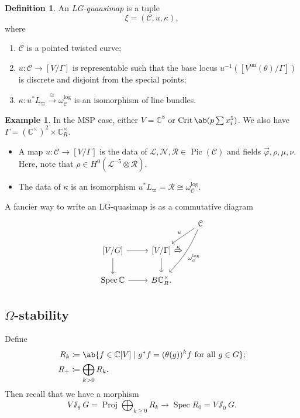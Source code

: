 \documentclass[10pt,oldfontcommands,oneside]{memoir}
\theoremstyle{definition}
\newtheorem{defn}[thm]{Definition}
\newtheorem{exm}[thm]{Example}
\theoremstyle{remark}
\theoremstyle{plain}
\theoremstyle{definition}
\theoremstyle{remark}
\newcommand{\C}{\mathbb{C}}
\newcommand{\mc}[1]{\mathcal{#1}}
\newcommand{\mr}[1]{\mathrm{#1}}
\newcommand{\on}[1]{\operatorname{#1}}
\newcommand{\1}{\mathbf{1}}
\newcommand{\2}{\mathbf{2}}
\newcommand{\3}{\mathbf{3}}
\DeclareMathOperator{\Pic}{Pic}
\DeclareMathOperator{\Spec}{Spec}
\DeclareMathOperator{\Proj}{Proj}
\begin{document}
\begin{defn}
    An \textit{LG-quaasimap} is a tuple
    \[ \xi = (\mc{C}, u, \kappa), \]
    where
    \begin{enumerate}
        \item $\mc{C}$ is a pointed twisted curve;
        \item $u \colon \mc{C} \to [V/\Gamma]$ is representable such that the base locus $u^{-1}([V^{\mr{un}}(\theta)/\Gamma])$ is discrete and disjoint from the special points;
        \item $\kappa \colon u^* L_{\varpi} \xrightarrow{\cong} \omega_{\mc{C}}^{\log}$ is an isomorphism of line bundles.
    \end{enumerate}
\end{defn}

\begin{exm}
    In the MSP case, either $V = \C^8$ or $\on{Crit} \ab(p \sum x_i^5)$. We also have $\Gamma = (\C^{\times})^2 \times \C^{\times}_R$.
    \begin{itemize}
        \item A map $u \colon \mc{C} \to [V/\Gamma]$ is the data of $\mc{L}, \mc{N}, \mc{R} \in \Pic(\mc{C})$ and fields $\vec{ \varphi }, \rho, \mu, \nu$. Here, note that $\rho \in H^0(\mc{L}^{-5} \otimes \mc{R})$.
        \item The data of $\kappa$ is an isomorphism $u^* L_{\varpi} = \mc{R} \cong \omega_{\mc{C}}^{\log}$.
    \end{itemize}
\end{exm}

A fancier way to write an LG-quasimap is as a commutative diagram
\begin{equation*}
\begin{tikzcd}
    & & \mc{C} \ar[swap]{dl}{u} \ar[bend left=10,""{swap,name=F}]{ddl}{\omega_{\mc{C}}^{\log}} \\
    { [V/G] } \ar{r} \ar{d} & { [V/\Gamma] } \ar{d} \ar[Rightarrow,to=F,"\kappa"]  \\
    \Spec \C \ar{r} & B \C^{\times}_R.
\end{tikzcd}
\end{equation*}

\subsection{\texorpdfstring{$\Omega$-stability}{Omega stability}}%
\label{sub:Omega-stability}

Define
\begin{align*}
    R_k &\coloneqq \ab\{ f \in \C[V] \mid g^* f = (\theta(g))^k f\text{ for all } g \in G \};\\
    R_+ &\coloneqq \bigoplus_{k >0} R_k.
\end{align*}
Then recall that we have a morphism
\[ V \sslash_{\theta} G = \Proj \bigoplus_{k \geq 0} R_k \to \Spec R_0 = V \sslash_0 G. \]
\end{document}
